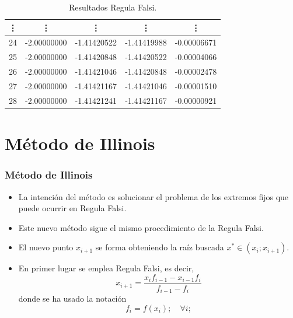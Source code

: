 \documentclass{beamer}
\begin{document}
\begin{frame}
{\begin{center}
\begin{table}[!ht]
\begin{center}
\begin{tabular}{|c||c||c||c||c|}
\vdots & \vdots & \vdots & \vdots & \vdots \\\hline
24 & -2.00000000 & -1.41420522 & -1.41419988 & -0.00006671 \\\hline
25 & -2.00000000 & -1.41420848 & -1.41420522 & -0.00004066 \\\hline
26 & -2.00000000 & -1.41421046 & -1.41420848 & -0.00002478 \\\hline
27 & -2.00000000 & -1.41421167 & -1.41421046 & -0.00001510 \\\hline
28 & -2.00000000 & -1.41421241 & -1.41421167 & -0.00000921 \\\hline
 \end{tabular}
 \caption{Resultados Regula Falsi.}\end{center}
 \label{tab_regfalsi}
\end{table}
  \end{center}}
\end{frame}
\section{M\'etodo de Illinois}
\begin{frame}
  \frametitle{M\'etodo de Illinois}
  \begin{itemize}
    \item<1-> La intenci\'on del m\'etodo es solucionar el problema de los extremos fijos que puede
    ocurrir en Regula Falsi. 
    \item<2->Este nuevo m\'etodo sigue el mismo procedimiento
    de la Regula Falsi.
    \item<3-> El nuevo punto $x_{i+1}$ se forma obteniendo la ra\'iz
    buscada $x^* \in (x_i ;x_{i+1})$. 
    \item<4->En primer lugar se emplea Regula Falsi, es decir,
    $$
      x_{i+1} = \frac{x_if_{i-1}-x_{i-1}f_i}{f_{i-1}-f_i}
    $$  
    donde se ha usado la notaci\'on
    $$
      f_i = f(x_i);\quad \forall i;
    $$
  \end{itemize}
\end{frame}
\end{document}
